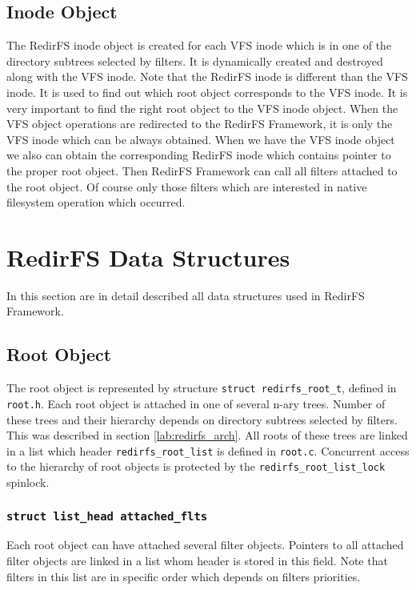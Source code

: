 \subsection{Inode Object}
The RedirFS inode object is created for each VFS inode which is in one of the directory
subtrees selected by filters. It is dynamically created and destroyed along with
the VFS
inode. Note that the RedirFS inode is different than the VFS inode. It is used to find out
which root object corresponds to the VFS inode. It is very important to find the right
root object to the VFS inode object. When the VFS object operations are redirected to
the RedirFS Framework, it is only the VFS inode which can be always obtained. When
we have the VFS inode object we also can obtain the corresponding RedirFS inode which contains
pointer to the proper root object. Then RedirFS Framework can call all filters
attached to the root object. Of course only those filters which are interested in native
filesystem operation which occurred.

\section{RedirFS Data Structures}
\label{lab:redirfs_data_struct}
In this section are in detail described all data structures used in RedirFS Framework.

\subsection{Root Object}
The root object is represented by structure \texttt{struct redirfs\_root\_t}, defined in
\texttt{root.h}. Each root object is attached in one of several n-ary trees. Number of
these trees and their hierarchy depends on directory subtrees selected by filters. This was
described in section \ref{lab:redirfs_arch}. All roots of these trees are linked in a list
which header \texttt{redirfs\_root\_list} is defined in \texttt{root.c}. Concurrent
access to the hierarchy of root objects is protected by the
\texttt{redirfs\_root\_list\_lock} spinlock.

\subsubsection{\texttt{struct list\_head attached\_flts}}
Each root object can have attached several filter objects. Pointers to all attached
filter objects are linked in a list whom header is stored in this field. Note that
filters in this list are in specific order which depends on filters priorities.

